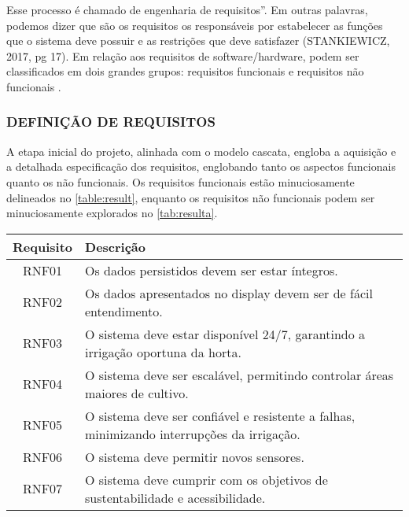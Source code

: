 \documentclass[%
  article,%
  a4paper,%
  12pt,%
  fleqn,%
  oneside,%
  chapter = TITLE,%
  section = TITLE,%
]{abntex2}
\begin{document}
 Esse processo é chamado de engenharia de requisitos”. Em outras palavras, podemos dizer que são os requisitos os responsáveis por estabelecer as funções que o sistema deve possuir e as restrições que deve satisfazer (STANKIEWICZ, 2017, pg 17). Em relação aos requisitos de software/hardware, podem ser classificados em dois grandes grupos: requisitos funcionais e requisitos não funcionais \cite{Sommerville2011}. 

  
\subsubsection{DEFINIÇÃO DE REQUISITOS}
A etapa inicial do projeto, alinhada com o modelo cascata, engloba a aquisição e a detalhada especificação dos requisitos, englobando tanto os aspectos funcionais quanto os não funcionais. Os requisitos funcionais estão minuciosamente delineados no \cref{table:result}, enquanto os requisitos não funcionais podem ser minuciosamente explorados no \cref{tab:resulta}. 

\begin{table*}[!htb]
\renewcommand{\tablename}{Quadro}
    \captionsetup{justification=raggedright,singlelinecheck=false}
    \caption{Requisitos Não Funcionais do Sistema}%
    \label{tab:resulta}
    \begin{tabular*}{\textwidth}{@{\extracolsep{\fill}} c >{\raggedright\arraybackslash}p{}}
        \toprule
        \textbf{Requisito} & \textbf{Descrição} \\
        \midrule
        RNF01 & Os dados persistidos devem ser estar íntegros. \\
        RNF02 & Os dados apresentados no display devem ser de fácil entendimento. \\
        RNF03 & O sistema deve estar disponível 24/7, garantindo a irrigação oportuna da horta.\\
        RNF04 & O sistema deve ser escalável, permitindo controlar áreas maiores de cultivo.\\
        RNF05 & O sistema deve ser confiável e resistente a falhas, minimizando interrupções da irrigação.\\
        RNF06 & O sistema deve permitir novos sensores. \\
        RNF07 & O sistema deve cumprir com os objetivos de sustentabilidade e acessibilidade. \\
        \bottomrule
    \end{tabular*}
\end{table*}
\end{document}

